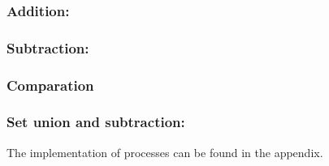 \subsubsection{Addition:}


\subsubsection{Subtraction:}


\subsubsection{Comparation}


\subsubsection{Set union and subtraction:}
The implementation of  processes can be found in the appendix.
